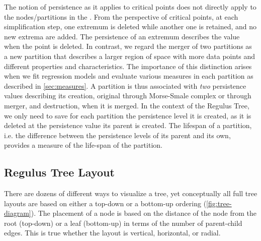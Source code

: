 The notion of persistence as it applies to critical points does not directly apply to the nodes/partitions in the \RT. From the perspective of critical points, at each simplification step, one extremum is deleted while another one is retained, and no new extrema are added. The persistence of an extremum describes the value when the point is deleted.
In contrast, we regard the merger of two partitions as a new partition that describes a larger region of space with more data points and different properties and characteristics. The importance of this distinction arises when we fit regression models and evaluate various measures in each partition as described in \ref{sec:measures}. A partition is thus associated with \textit{two} persistence values describing its creation, original through Morse-Smale complex or through merger, and destruction, when it is merged. In the context of the Regulus Tree, we only need to save for each partition the persistence level it is created, as it is deleted at the persistence value its parent is created. The lifespan of a partition, i.e. the difference between the persistence levels of its parent and its own, provides a measure of the life-span of the partition.


\subsection{Regulus Tree Layout}
\label{sec:tree}
There are dozens of different ways to visualize a tree, yet conceptually all full tree layouts are based on either a top-down or a bottom-up ordering (\autoref{fig:tree-diagram}). The placement of a node is based on the distance of the node from the root (top-down) or a leaf (bottom-up) in terms of the number of parent-child edges. This is true whether the layout is vertical, horizontal, or radial. 


